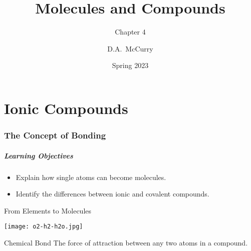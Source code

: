 \documentclass[handout]{beamer}
\title{Molecules and Compounds}
\subtitle{Chapter 4}
\institute[CHEM115 Bloomsburg University]{CHEM115 --- Chemistry for the Sciences I \\ Bloomsburg University}
\author{D.A.\ McCurry}
\date{Spring 2023}
\begin{document}
\maketitle

\part{Ionic Compounds}

\section{The Concept of Bonding}
\begin{frame}
	\frametitle{Learning Objectives}
	\begin{itemize}
	\item Explain how single atoms can become molecules.
	\item Identify the differences between ionic and covalent compounds.
	\end{itemize}
\end{frame}


\begin{frame}{From Elements to Molecules}
	\begin{center}
		\texttt{[image: o2-h2-h2o.jpg]}
	\end{center}

	\begin{block}{Chemical Bond}
		The force of attraction between any two atoms in a compound.
	\end{block}
\end{frame}
\end{document}
